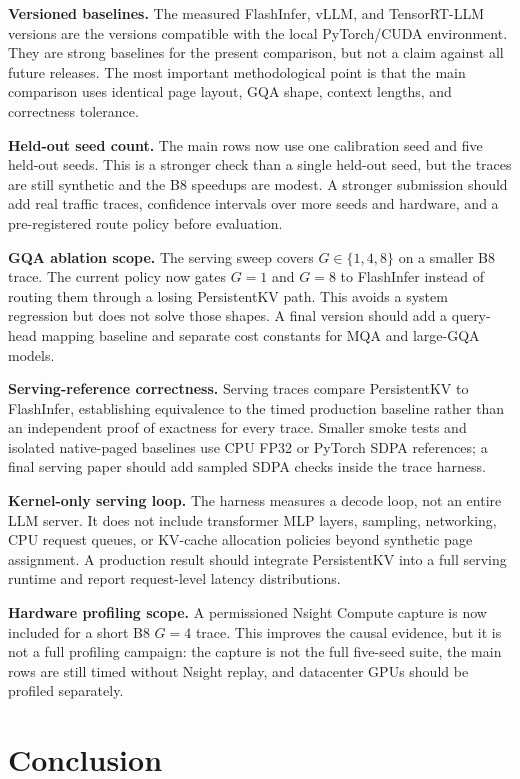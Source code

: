 \documentclass[10pt]{article}
\begin{document}
\textbf{Versioned baselines.} The measured FlashInfer, vLLM, and TensorRT-LLM
versions are the versions compatible with the local PyTorch/CUDA environment.
They are strong baselines for the present comparison, but not a claim against
all future releases. The most important methodological point is that the main
comparison uses identical page layout, GQA shape, context lengths, and
correctness tolerance.

\textbf{Held-out seed count.} The main rows now use one calibration seed and
five held-out seeds. This is a stronger check than a single held-out seed, but
the traces are still synthetic and the B8 speedups are modest. A stronger
submission should add real traffic traces, confidence intervals over more seeds
and hardware, and a pre-registered route policy before evaluation.

\textbf{GQA ablation scope.} The serving sweep covers $G\in\{1,4,8\}$ on a
smaller B8 trace. The current policy now gates $G=1$ and $G=8$ to FlashInfer
instead of routing them through a losing PersistentKV path. This avoids a
system regression but does not solve those shapes. A final version should add a
query-head mapping baseline and separate cost constants for MQA and large-GQA
models.

\textbf{Serving-reference correctness.} Serving traces compare PersistentKV to
FlashInfer, establishing equivalence to the timed production baseline rather
than an independent proof of exactness for every trace. Smaller smoke tests and
isolated native-paged baselines use CPU FP32 or PyTorch SDPA references; a
final serving paper should add sampled SDPA checks inside the trace harness.

\textbf{Kernel-only serving loop.} The harness measures a decode loop, not an
entire LLM server. It does not include transformer MLP layers, sampling,
networking, CPU request queues, or KV-cache allocation policies beyond synthetic
page assignment. A production result should integrate PersistentKV into a full
serving runtime and report request-level latency distributions.

\textbf{Hardware profiling scope.} A permissioned Nsight Compute capture is now
included for a short B8 $G=4$ trace. This improves the causal evidence, but it
is not a full profiling campaign: the capture is not the full five-seed suite,
the main rows are still timed without Nsight replay, and datacenter GPUs should
be profiled separately.

\section{Conclusion}
\end{document}

